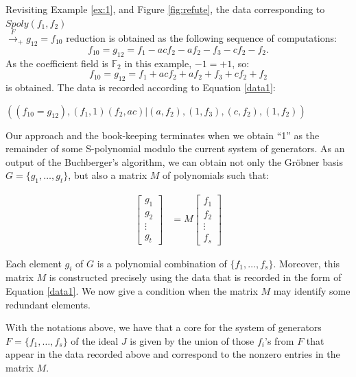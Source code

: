 \begin{Example}
Revisiting Example \ref{ex:1}, and Figure \ref{fig:refute}, the data
corresponding to $Spoly(f_1,f_2)$\\$\xrightarrow{F}_+  g_{12} = f_{10}$
reduction is obtained as the following sequence of computations:
$$f_{10}=g_{12}=f_1-acf_2-af_2-f_3-cf_2-f_2.$$ As the coefficient
field is $\mathbb{F}_2$ in this example, $-1 = +1$, so:
$$f_{10}=g_{12}=f_1+acf_2+af_2+f_3+cf_2+f_2$$ is obtained.
The data is recorded according to Equation \ref{data1}:

\begin{center}
$((f_{10}=g_{12}), (f_1,1)(f_2,ac)|(a,f_2),(1,f_3),(c,f_2),(1,f_2))$
\end{center}

\end{Example}

Our approach and the book-keeping terminates when we obtain ``1'' as the
remainder of some S-polynomial modulo the current system of 
generators. As an output of the Buchberger's algorithm, we can obtain
not only the Gr\"obner basis $G = \{g_1,\ldots,g_t\}$, but also a
matrix $M$ of polynomials such that: 

\vspace{-0.1in}
\begin{center}
\begin{align}
   \begin{bmatrix}
           g_{1} \\
           g_{2} \\
           \vdots \\
           g_{t}
         \end{bmatrix}
    &= M \begin{bmatrix}
           f_{1} \\
           f_{2} \\
           \vdots \\
           f_{s}
         \end{bmatrix}
  \end{align}

\end{center}

Each element $g_i$ of $G$ is a polynomial combination of $\{f_1, \dots,
f_s\}$. Moreover, this matrix $M$ is constructed precisely using the
data that is recorded in the form of Equation \ref{data1}. We now give a condition
when the matrix $M$ may identify some redundant elements. 


\begin{Theorem}
\label{thm}
With the notations above, we have that a core for the system of
generators $F = \{f_1,\dots,f_s\}$ of the ideal $J$ is given by the
union of those $f_i$'s from $F$ that appear in the data recorded above
and correspond to the nonzero entries in the matrix $M$.  
\end{Theorem}


